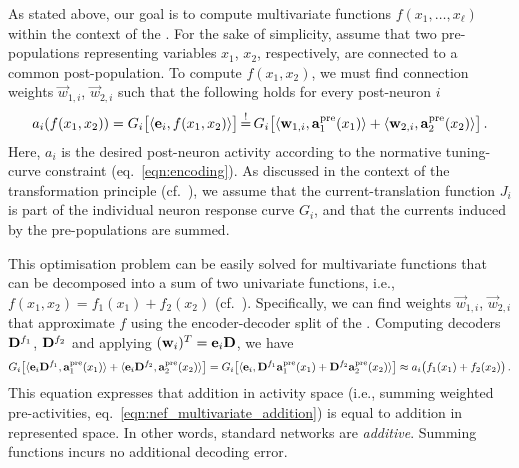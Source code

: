 As stated above, our goal is to compute multivariate functions $f(x_1, \ldots, x_\ell)$ within the context of the \NEF.
For the sake of simplicity, assume that two pre-populations representing variables $x_1$, $x_2$, respectively, are connected to a common post-population.
To compute $f(x_1, x_2)$, we must find connection weights $\vec w_{1, i}$, $\vec w_{2, i}$ such that the following holds for every post-neuron $i$
\begin{align}
	a_i(f(x_1, x_2))
		= G_i \bigl[
			\langle \mathbf{e}_i, f(x_1, x_2) \rangle
		\bigr]
		\operatorname{\overset{!}{=}} G_i\bigl[
			\langle \mathbf{w}_{1, i}, \mathbf{a}^\mathrm{pre}_1(x_1) \rangle + \langle \mathbf{w}_{2, i}, \mathbf{a}^\mathrm{pre}_2(x_2)
		\rangle\bigr] \,.
	\label{eqn:nef_multivariate_addition}
\end{align}
Here, $a_i$ is the desired post-neuron activity according to the normative tuning-curve constraint (eq.~\ref{eqn:encoding}).
As discussed in the context of the \NEF transformation principle (cf.~), we assume that the current-translation function $J_i$ is part of the individual neuron response curve $G_i$, and that the currents induced by the pre-populations are summed.

This optimisation problem can be easily solved for multivariate functions that can be decomposed into a sum of two univariate functions, i.e., $f(x_1, x_2) = f_1(x_1) + f_2(x_2)$ (cf.~).
Specifically, we can find weights $\vec w_{1, i}$, $\vec w_{2, i}$ that approximate $f$ using the encoder-decoder split of the \NEF. %
Computing decoders $\mathbf{D}^{f_1}$, $\mathbf{D}^{f_2}$ and applying $(\mathbf{w}_i)^T = \mathbf{e}_i \mathbf{D}$, we have
\begin{align*}
	G_i\bigl[
	  \langle
	  	\mathbf{e}_i \mathbf{D}^{f_1},
	  	\mathbf{a}^\mathrm{pre}_1(x_1)
	  \rangle
	+ \langle
	  	\mathbf{e}_i \mathbf{D}^{f_2},
		\mathbf{a}^\mathrm{pre}_2(x_2)
	\rangle\bigr] = 
	G_i\bigl[\langle \mathbf{e}_i, \mathbf{D}^{f_1} \mathbf{a}_1^\mathrm{pre}(x_1) + \mathbf{D}^{f_2} \mathbf{a}_2^\mathrm{pre}(x_2) \rangle\bigr]
	\approx a_i\bigl(f_1(x_1) + f_2(x_2)\bigr) \,.
\end{align*}
This equation expresses that addition in activity space (i.e., summing weighted pre-activities, eq.~\ref{eqn:nef_multivariate_addition}) is equal to addition in represented space.
In other words, standard \NEF networks are \emph{additive}.
Summing functions incurs no additional decoding error.

